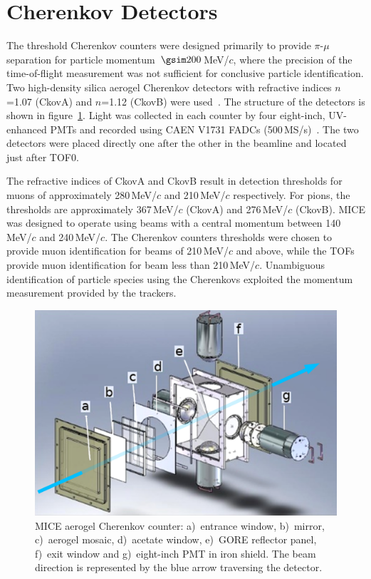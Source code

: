 \graphicspath{{03-Ckov/Figures/}}

\section{Cherenkov Detectors}
\label{Sect:Ckov}

The threshold Cherenkov counters were designed primarily to provide
$\pi$-$\mu$ separation for particle momentum~$\gsim 200$\,MeV/$c$, where
the precision of the time-of-flight measurement was not sufficient for
conclusive particle identification.
Two high-density silica aerogel Cherenkov detectors with refractive
indices $n$=1.07 (CkovA) and $n$=1.12 (CkovB) were
used~\cite{Cremaldi:2009zj}.
The structure of the detectors is shown in figure~\ref{fig:ckov1}.
Light was collected in each counter by four eight-inch, UV-enhanced
PMTs and recorded using CAEN V1731 FADCs (500\,MS/s)~\cite{NOTE473}.
The two detectors were placed directly one after the other in the
beamline and located just after TOF0.

The refractive indices of CkovA and CkovB result in detection
thresholds for muons of approximately 280\,MeV/$c$ and 210\,MeV/$c$ respectively.
For pions, the thresholds are approximately 367\,MeV/$c$ (CkovA) and
276\,MeV/$c$ (CkovB).
MICE was designed to operate using beams with a central momentum
between 140\,MeV/$c$ and 240\,MeV/$c$.
The Cherenkov counters thresholds were chosen to provide muon identification for beams of 210\,MeV/$c$ and above, while the TOFs provide muon identification for beam less  than 210\,MeV/$c$.
Unambiguous identification of particle species using the Cherenkovs
exploited the momentum measurement provided by the trackers. \\
\begin{figure}[htb]
  \begin{center}
    \includegraphics[width=0.6\columnwidth]{./03-Ckov/Figures/Ckov_fix-with_beam.png}
  \end{center}
  \caption{
    MICE aerogel Cherenkov counter: a)~entrance window,
    b)~mirror, c)~aerogel mosaic, d)~acetate window, e)~GORE reflector
    panel, f)~exit window and g)~eight-inch PMT in iron shield.
    The beam direction is represented by the blue arrow traversing the detector.
  } 
  \label{fig:ckov1}
\end{figure}

